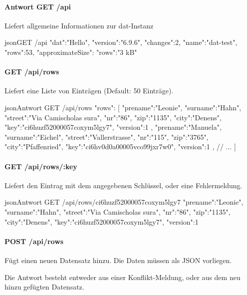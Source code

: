 \paragraph{Antwort GET /api} Liefert allgemeine Informationen zur dat-Instanz
\begin{srclst}{json}{GET /api}
    {
        "dat":"Hello",
        "version":"6.9.6",
        "changes":2,
        "name":"dat-test",
        "rows":53,
        "approximateSize":{
            "rows":"3 kB"
        }
    }
\end{srclst}

\paragraph{GET /api/rows} 
Liefert eine Liste von Einträgen (Default: 50 Einträge).
\begin{srclst}{json}{Antwort GET /api/rows}
{
    "rows": [
        {
            "prename":"Leonie", "surname":"Hahn", 
            "street":"Via Camischolas sura", "nr":"86", 
            "zip":"1135", "city":"Denens", 
            "key":"ci6huzf52000057coxym5lgy7", "version":1
        },
        {
            "prename":"Manuela", "surname":"Eichel", 
            "street":"Vallerstrasse", "nr":"115",
            "zip":"3765", "city":"Pfaffenried", 
            "key":"ci6hv0d0a00005vco99jxr7w0", "version":1
        },
        // ...
    ]
}
\end{srclst}

\paragraph{GET /api/rows/:key}
Liefert den Eintrag mit dem angegebenen Schlüssel, oder eine Fehlermeldung.

\begin{srclst}{json}{Antwort GET /api/rows/ci6huzf52000057coxym5lgy7}
{
    "prename":"Leonie", "surname":"Hahn", 
    "street":"Via Camischolas sura", "nr":"86", 
    "zip":"1135", "city":"Denens", 
    "key":"ci6huzf52000057coxym5lgy7", "version":1
}
\end{srclst}

\paragraph{POST /api/rows}
Fügt einen neuen Datensatz hinzu. Die Daten müssen als JSON vorliegen.

Die Antwort besteht entweder aus einer Konflikt-Meldung, oder aus dem neu hinzu gefügten Datensatz.

